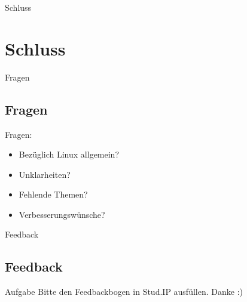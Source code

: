 
\begin{frame}{Schluss}
    \section{Schluss}\label{sec:schluss}
\end{frame}

\begin{frame}{Fragen}
    \subsection{Fragen}\label{subsec:Fragen}

    Fragen:
    \pause

    \begin{itemize}
        \item Bezüglich Linux allgemein?\pause
        \item Unklarheiten?\pause
        \item Fehlende Themen?\pause
        \item Verbesserungswünsche?
    \end{itemize}

\end{frame}

\begin{frame}{Feedback}
    \subsection{Feedback}\label{subsec:feedback}

    \vspace{0.5cm}
    \begin{alertblock}{Aufgabe}
        Bitte den Feedbackbogen in Stud.IP ausfüllen.
        \linebreak
        Danke :)
    \end{alertblock}

\end{frame}